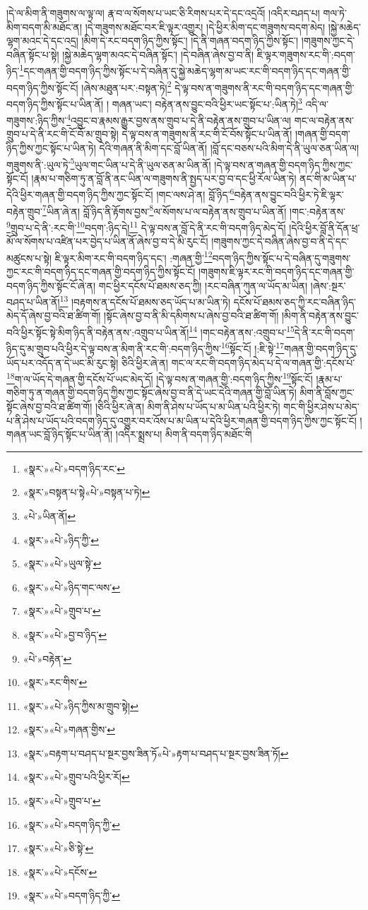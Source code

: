 །དེ་ལ་མིག་ནི་གཟུགས་ལ་ལྟ་ལ། རྣ་བ་ལ་སོགས་པ་ཡང་ཅི་རིགས་པར་དེ་དང་འདྲའོ། །འདིར་བཤད་པ། གལ་ཏེ་མིག་བདག་མི་མཐོང་ན། །དེ་གཟུགས་མཐོང་བར་ཇི་ལྟར་འགྱུར། །དེ་ཕྱིར་མིག་དང་གཟུགས་བདག་མེད། །སྐྱེ་མཆེད་ལྷག་མའང་དེ་དང་འདྲ། །མིག་དེ་རང་བདག་ཉིད་ཀྱིས་སྟོང་། །དེ་ནི་གཞན་བདག་ཉིད་ཀྱིས་སྟོང་། །གཟུགས་ཀྱང་དེ་བཞིན་སྟོང་པ་སྟེ། །སྐྱེ་མཆེད་ལྷག་མའང་དེ་བཞིན་སྟོང་། །དེ་བཞིན་ཞེས་བྱ་བ་ནི། ཇི་ལྟར་གཟུགས་རང་གི་:བདག་ཉིད་\footnote{«སྣར་»«པེ་»བདག་ཉིད་རང་}དང་གཞན་གྱི་བདག་ཉིད་ཀྱིས་སྟོང་པ་དེ་བཞིན་དུ་སྐྱེ་མཆེད་ལྷག་མ་ཡང་རང་གི་བདག་ཉིད་དང་གཞན་གྱི་བདག་ཉིད་ཀྱིས་སྟོང་ངོ། །ཞེས་མཐུན་པར་:བསྟན་ཏེ།\footnote{«སྣར་»བསྟན་པ་སྟེ«པེ་»བསྟན་པ་ཏེ།} དེ་ལྟ་བས་ན་གཟུགས་ནི་རང་གི་བདག་ཉིད་དང་གཞན་གྱི་བདག་ཉིད་ཀྱིས་སྟོང་པ་ཡིན་ནོ། །
གཞན་ཡང་། བརྟེན་ནས་བྱུང་བའི་ཕྱིར་ཡང་སྟོང་པ་:ཡིན་ཏེ།\footnote{«པེ་»ཡིན་ནོ།} འདི་ལ་གཟུགས་:ཉིད་ཀྱིས་\footnote{«སྣར་»«པེ་»ཉིད་ཀྱི་}འབྱུང་བ་རྣམས་རྒྱུར་བྱས་ནས་གྲུབ་པ་དེ་ནི་བརྟེན་ནས་གྲུབ་པ་ཡིན་ལ། གང་ལ་བརྟེན་ནས་གྲུབ་པ་དེ་ནི་རང་གི་ངོ་བོ་མ་གྲུབ་སྟེ། དེ་ལྟ་བས་ན་གཟུགས་ནི་རང་གི་ངོ་བོས་སྟོང་པ་ཡིན་ནོ། །གཞན་གྱི་བདག་ཉིད་ཀྱིས་ཀྱང་སྟོང་པ་ཡིན་ཏེ། དེའི་གཞན་ནི་མིག་དང་བློ་ཡིན་ནོ། །བློ་དང་བཅས་པའི་མིག་དེ་ནི་ཡུལ་ཅན་ཡིན་ལ། གཟུགས་ནི་:ཡུལ་ཏེ་\footnote{«སྣར་»«པེ་»ཡུལ་སྟེ་}ཡུལ་གང་ཡིན་པ་དེ་ནི་ཡུལ་ཅན་མ་ཡིན་ནོ། །དེ་ལྟ་བས་ན་གཞན་གྱི་བདག་ཉིད་ཀྱིས་ཀྱང་སྟོང་ངོ། །རྣམ་པ་གཅིག་ཏུ་ན་བློ་ནི་ནང་ཡིན་ལ་གཟུགས་ནི་སྤྱད་པར་བྱ་བ་དང་ཕྱི་རོལ་ཡིན་ཏེ། ནང་གི་མ་ཡིན་པ་དེའི་ཕྱིར་གཞན་གྱི་བདག་ཉིད་ཀྱིས་ཀྱང་སྟོང་ངོ། །གང་ལས་ཤེ་ན། བློ་ཉིད་\footnote{«སྣར་»«པེ་»ཉིད་གང་ལས་}བརྟེན་ནས་བྱུང་བའི་ཕྱིར་ཏེ་ཇི་ལྟར་བརྟེན་གྲུབ་\footnote{«སྣར་»«པེ་»གྲུབ་པ་}ཡིན་ཞེ་ན། བློ་ཉིད་ནི་རྟོགས་བྱས་\footnote{«སྣར་»«པེ་»བྱ་བ་ཉིད་}ལ་སོགས་པ་ལ་བརྟེན་ནས་གྲུབ་པ་ཡིན་ནོ། །གང་:བརྟེན་ནས་\footnote{«པེ་»བརྟེན་}གྲུབ་པ་དེ་ནི་:རང་གི་\footnote{«སྣར་»རང་གིས་}བདག་:ཉིད་དེ།\footnote{«སྣར་»«པེ་»ཉིད་ཀྱིས་མ་གྲུབ་སྟེ།} དེ་ལྟ་བས་ན་བློ་དེ་ནི་རང་གི་བདག་ཉིད་མེད་དོ། །དེའི་ཕྱིར་བློ་ནི་དོན་ཕྲ་མོ་ལ་སོགས་པ་འཛིན་པར་བྱེད་པ་ཡིན་ནོ་ཞེས་བྱ་བ་དེ་མི་རུང་ངོ། །གཟུགས་ཀྱང་དེ་བཞིན་ཞེས་བྱ་བ་ནི་དེ་དང་མཚུངས་པ་སྟེ། ཇི་ལྟར་མིག་རང་གི་བདག་ཉིད་དང་། :གཞན་གྱི་\footnote{«སྣར་»«པེ་»གཞན་གྱིས་}བདག་ཉིད་ཀྱིས་སྟོང་པ་དེ་བཞིན་དུ་གཟུགས་ཀྱང་རང་གི་བདག་ཉིད་དང་གཞན་གྱི་བདག་ཉིད་ཀྱིས་སྟོང་ངོ། །གཟུགས་ཇི་ལྟར་རང་གི་བདག་ཉིད་དང་གཞན་གྱི་བདག་ཉིད་ཀྱིས་སྟོང་ངོ་ཞེ་ན། གང་ཕྱིར་དངོས་པོ་ཐམས་ཅད་ཀྱི། །རང་བཞིན་ཀུན་ལ་ཡོད་མ་ཡིན། །ཞེས་:སྔར་བཤད་པ་ཡིན་ནོ།\footnote{«སྣར་»བརྟག་པ་བཤད་པ་སྔར་བྱས་ཟིན་ཏོ«པེ་»རྟག་པ་བཤད་པ་སྔར་བྱས་ཟིན་ཏོ།} །བརྟགས་ན་དངོས་པོ་ཐམས་ཅད་ཡོད་པ་མ་ཡིན་ཏེ། དངོས་པོ་ཐམས་ཅད་ཀྱི་རང་བཞིན་ཉིད་མེད་དོ་ཞེས་བྱ་བའི་ཐ་ཚིག་གོ། །སྟོང་ཞེས་བྱ་བ་ནི་མི་དམིགས་པ་ཞེས་བྱ་བའི་ཐ་ཚིག་གོ། །མིག་ནི་བརྟེན་ནས་བྱུང་བའི་ཕྱིར་སྟོང་སྟེ་མིག་ཉིད་ནི་བརྟེན་ནས་:འགྲུབ་པ་ཡིན་ནོ།\footnote{«སྣར་»«པེ་»གྲུབ་པའི་ཕྱིར་རོ།} །གང་བརྟེན་ནས་:འགྲུབ་པ་\footnote{«སྣར་»«པེ་»གྲུབ་པ་}དེ་ནི་རང་གི་བདག་ཉིད་དུ་མ་གྲུབ་པའི་ཕྱིར་དེ་ལྟ་བས་ན་མིག་ནི་རང་གི་:བདག་ཉིད་ཀྱིས་\footnote{«སྣར་»«པེ་»བདག་ཉིད་ཀྱི་}སྟོང་ངོ། །:ཇི་སྟེ་\footnote{«སྣར་»«པེ་»ཅི་སྟེ་}གཞན་གྱི་བདག་ཉིད་དུ་ཡོད་པར་འདོད་ན་དེ་ཡང་མི་རུང་སྟེ། ཅིའི་ཕྱིར་ཞེ་ན། གང་ལ་རང་གི་བདག་ཉིད་མེད་པ་དེ་ལ་གཞན་གྱི་:དངོས་པོ་\footnote{«སྣར་»«པེ་»དངོས་}ག་ལ་ཡོད་དེ་གཞན་གྱི་དངོས་པོ་ཡང་མེད་དོ། །དེ་ལྟ་བས་ན་གཞན་གྱི་:བདག་ཉིད་ཀྱིས་\footnote{«སྣར་»«པེ་»བདག་ཉིད་ཀྱི་}སྟོང་ངོ། །རྣམ་པ་གཅིག་ཏུ་ན་གཞན་གྱི་བདག་ཉིད་ཀྱིས་ཀྱང་སྟོང་ཞེས་བྱ་བ་ནི་དེ་ཡང་དེའི་གཞན་གྱི་བློ་ཡིན་ཏེ། མིག་ནི་བློས་ཀྱང་སྟོང་ཞེས་བྱ་བའི་ཐ་ཚིག་གོ། །ཅིའི་ཕྱིར་ཞེ་ན། མིག་ནི་ཤེས་པ་ཡོད་པ་མ་ཡིན་པའི་ཕྱིར་ཏེ། གང་གི་ཕྱིར་ཤེས་པ་མེད་པ་ནི་ཤེས་པ་ཡོད་པའི་བདག་ཉིད་དུ་འགྱུར་བར་འོས་པ་མ་ཡིན་པ་དེའི་ཕྱིར་གཞན་གྱི་བདག་ཉིད་ཀྱིས་ཀྱང་སྟོང་ངོ། །གཞན་ཡང་བློ་ཉིད་སྟོང་པ་ཡིན་ནོ། །འདིར་སྨྲས་པ། མིག་ནི་བདག་ཉིད་མཐོང་གི 